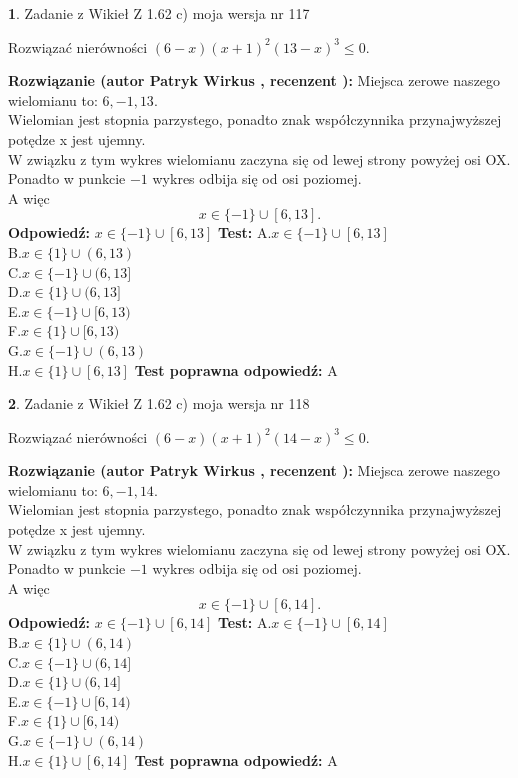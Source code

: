\documentclass[12pt, a4paper]{article}
\theoremstyle{definition} %
\newtheorem{zad}{}
\newcommand{\zadStart}[1]{\begin{zad}#1\newline}
\newcommand{\zadStop}{\end{zad}}
\newcommand{\rozwStart}[2]{\noindent \textbf{Rozwiązanie (autor #1 , recenzent #2): }\newline}
\newcommand{\rozwStop}{\newline}
\newcommand{\odpStart}{\noindent \textbf{Odpowiedź:}\newline}
\newcommand{\odpStop}{\newline}
\newcommand{\testStart}{\noindent \textbf{Test:}\newline}
\newcommand{\testStop}{\newline}
\newcommand{\kluczStart}{\noindent \textbf{Test poprawna odpowiedź:}\newline}
\newcommand{\kluczStop}{\newline}
\begin{document}
\zadStart{Zadanie z Wikieł Z 1.62 c) moja wersja nr 117}

Rozwiązać nierówności $(6-x)(x+1)^{2}(13-x)^{3}\le0$.
\zadStop
\rozwStart{Patryk Wirkus}{}
Miejsca zerowe naszego wielomianu to: $6, -1, 13$.\\
Wielomian jest stopnia parzystego, ponadto znak współczynnika przy\linebreak najwyższej potędze x jest ujemny.\\ W związku z tym wykres wielomianu zaczyna się od lewej strony powyżej osi OX.\\
Ponadto w punkcie $-1$ wykres odbija się od osi poziomej.\\
A więc $$x \in \{-1\} \cup [6,13].$$
\rozwStop
\odpStart
$x \in \{-1\} \cup [6,13]$
\odpStop
\testStart
A.$x \in \{-1\} \cup [6,13]$\\
B.$x \in \{1\} \cup (6,13)$\\
C.$x \in \{-1\} \cup (6,13]$\\
D.$x \in \{1\} \cup (6,13]$\\
E.$x \in \{-1\} \cup [6,13)$\\
F.$x \in \{1\} \cup [6,13)$\\
G.$x \in \{-1\} \cup (6,13)$\\
H.$x \in \{1\} \cup [6,13]$
\testStop
\kluczStart
A
\kluczStop



\zadStart{Zadanie z Wikieł Z 1.62 c) moja wersja nr 118}

Rozwiązać nierówności $(6-x)(x+1)^{2}(14-x)^{3}\le0$.
\zadStop
\rozwStart{Patryk Wirkus}{}
Miejsca zerowe naszego wielomianu to: $6, -1, 14$.\\
Wielomian jest stopnia parzystego, ponadto znak współczynnika przy\linebreak najwyższej potędze x jest ujemny.\\ W związku z tym wykres wielomianu zaczyna się od lewej strony powyżej osi OX.\\
Ponadto w punkcie $-1$ wykres odbija się od osi poziomej.\\
A więc $$x \in \{-1\} \cup [6,14].$$
\rozwStop
\odpStart
$x \in \{-1\} \cup [6,14]$
\odpStop
\testStart
A.$x \in \{-1\} \cup [6,14]$\\
B.$x \in \{1\} \cup (6,14)$\\
C.$x \in \{-1\} \cup (6,14]$\\
D.$x \in \{1\} \cup (6,14]$\\
E.$x \in \{-1\} \cup [6,14)$\\
F.$x \in \{1\} \cup [6,14)$\\
G.$x \in \{-1\} \cup (6,14)$\\
H.$x \in \{1\} \cup [6,14]$
\testStop
\kluczStart
A
\kluczStop
\end{document}
